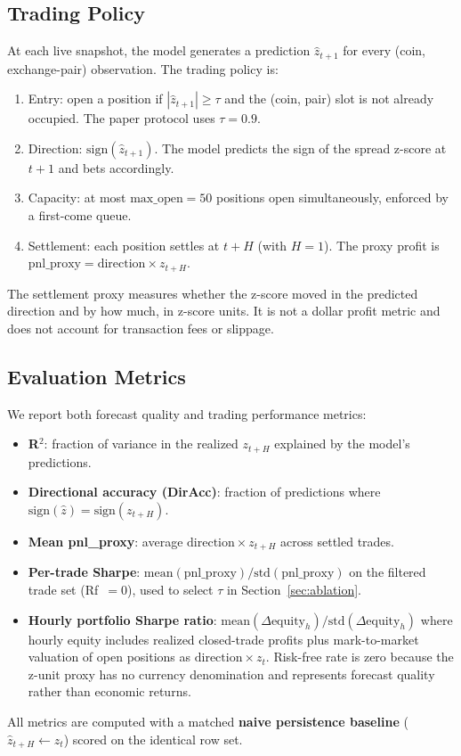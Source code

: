 \subsection{Trading Policy}\label{sec:policy}

At each live snapshot, the model generates a prediction $\hat{z}_{t+1}$ for every (coin, exchange-pair) observation. The trading policy is:

\begin{enumerate}
    \item Entry: open a position if $|\hat{z}_{t+1}| \geq \tau$ and the (coin, pair) slot is not already occupied. The paper protocol uses $\tau{=}0.9$.
    \item Direction: $\text{sign}(\hat{z}_{t+1})$. The model predicts the sign of the spread z-score at $t+1$ and bets accordingly.
    \item Capacity: at most $\text{max\_open} = 50$ positions open simultaneously, enforced by a first-come queue.
    \item Settlement: each position settles at $t+H$ (with $H=1$). The proxy profit is $\text{pnl\_proxy} = \text{direction} \times z_{t+H}$.
\end{enumerate}

The settlement proxy measures whether the z-score moved in the predicted direction and by how much, in z-score units. It is not a dollar profit metric and does not account for transaction fees or slippage.


\subsection{Evaluation Metrics}

We report both forecast quality and trading performance metrics:

\begin{itemize}
    \item \textbf{R$^2$}: fraction of variance in the realized $z_{t+H}$ explained by the model's predictions.
    \item \textbf{Directional accuracy (DirAcc)}: fraction of predictions where $\text{sign}(\hat{z}) = \text{sign}(z_{t+H})$.
    \item \textbf{Mean pnl\_proxy}: average $\text{direction} \times z_{t+H}$ across settled trades.
    \item \textbf{Per-trade Sharpe}: $\text{mean}(\text{pnl\_proxy}) / \text{std}(\text{pnl\_proxy})$ on the filtered trade set (Rf~$=0$), used to select $\tau$ in Section~\ref{sec:ablation}.
    \item \textbf{Hourly portfolio Sharpe ratio}: $\text{mean}(\Delta\text{equity}_h) / \text{std}(\Delta\text{equity}_h)$ where hourly equity includes realized closed-trade profits plus mark-to-market valuation of open positions as $\text{direction} \times z_t$. Risk-free rate is zero because the z-unit proxy has no currency denomination and represents forecast quality rather than economic returns.
\end{itemize}

All metrics are computed with a matched \textbf{naive persistence baseline} ($\hat{z}_{t+H} \leftarrow z_t$) scored on the identical row set.
